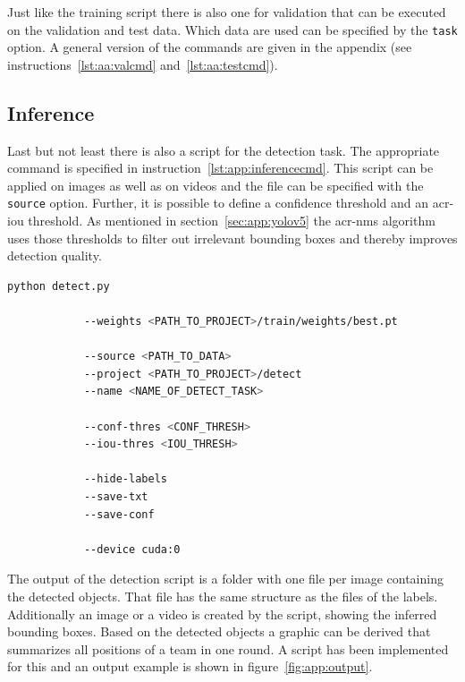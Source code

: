 Just like the training script there is also one for validation that can be executed on the validation and 
test data. Which data are used can be specified by the \texttt{task} option. A general version of the 
commands are given in the appendix (see instructions~\ref{lst:aa:valcmd} and~\ref{lst:aa:testcmd}).

\subsection{Inference}\label{subsec:app:inference}

Last but not least there is also a script for the detection task. The appropriate command is 
specified in instruction~\ref{lst:app:inferencecmd}. This script can be applied on images as well as 
on videos and the file can be specified with the \texttt{source} option. Further, it is possible to define 
a confidence threshold and an \gls{acr-iou} threshold. As mentioned in section~\ref{sec:app:yolov5} 
the \gls{acr-nms} algorithm uses those thresholds to filter out irrelevant bounding boxes and thereby 
improves detection quality. 

\begin{minipage}{\linewidth}
	\vspace*{0.3cm}
	\begin{lstlisting}[language=Bash, keywordstyle=\color{black}, 
		caption=General command to start the detection with YOLOv5., label=lst:app:inferencecmd]
		python detect.py
		
			--weights <PATH_TO_PROJECT>/train/weights/best.pt
			
			--source <PATH_TO_DATA>
			--project <PATH_TO_PROJECT>/detect
			--name <NAME_OF_DETECT_TASK>
			
			--conf-thres <CONF_THRESH>
			--iou-thres <IOU_THRESH>
			
			--hide-labels
			--save-txt
			--save-conf
						
			--device cuda:0
	\end{lstlisting}
\end{minipage}

The output of the detection script is a folder with one file per image containing the detected objects. 
That file has the same structure as the files of the labels. Additionally an image or a video is 
created by the script, showing the inferred bounding boxes. Based on the detected objects a graphic 
can be derived that summarizes all positions of a team in one round. A script has been implemented 
for this and an output example is shown in figure~\ref{fig:app:output}.
